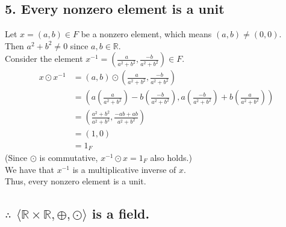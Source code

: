 \documentclass[11pt, a4paper]{article}
\begin{document}
\subsection*{5. Every nonzero element is a unit}
Let $x = (a,b) \in F$ be a nonzero element, which means $(a,b) \neq (0,0)$.\\
Then $a^2 + b^2 \neq 0$ since $a,b \in \mathbb{R}$.\\
Consider the element $x^{-1} = \left( \frac{a}{a^2+b^2}, \frac{-b}{a^2+b^2} \right) \in F$.
\begin{align*}
    x\odot x^{-1} &= (a,b) \odot \left( \frac{a}{a^2+b^2}, \frac{-b}{a^2+b^2} \right)\\
    &= \left( a\left(\frac{a}{a^2+b^2}\right) - b\left(\frac{-b}{a^2+b^2}\right), a\left(\frac{-b}{a^2+b^2}\right) + b\left(\frac{a}{a^2+b^2}\right) \right) \\
    &= \left( \frac{a^2+b^2}{a^2+b^2}, \frac{-ab+ab}{a^2+b^2} \right) \\
    &= (1,0)\\
    &= 1_F
\end{align*}
(Since $\odot$ is commutative, $x^{-1} \odot x = 1_F$ also holds.)\\
We have that $x^{-1}$ is a multiplicative inverse of $x$.\\
Thus, every nonzero element is a unit.

\subsection*{$\therefore$ $\langle \mathbb{R}\times \mathbb{R}, \oplus, \odot \rangle$ is a field.}
\end{document}
